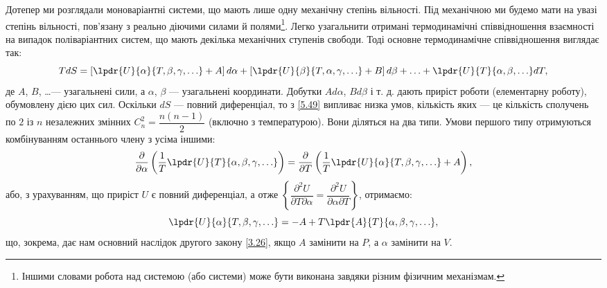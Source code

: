 Дотепер ми розглядали моноваріантні системи, що мають лише одну механічну степінь вільності. Під механічною ми будемо мати на увазі степінь вільності, пов'язану з реально діючими силами й полями\footnote{Іншими словами робота над системою (або системи) може бути виконана завдяки різним фізичним механізмам.}. Легко узагальнити отримані термодинамічні співвідношення взаємності на випадок поліваріантних систем, що мають декілька механічних ступенів свободи. Тоді основне термодинамічне співвідношення виглядає так:
\begin{equation}\label{5.49}
	TdS=\left[\lpdr{U}{\alpha}{T, \beta, \gamma, \ldots}+A\right]d\alpha
	+\left[\lpdr{U}{\beta}{T,\alpha, \gamma,
			\ldots}+B\right]d\beta+\ldots+\lpdr{U}{T}{\alpha,\beta,\ldots}dT,
\end{equation}
де $A$, $B$, \ldots --- узагальнені сили, а $\alpha$, $\beta$ --- узагальнені координати. Добутки $Ad\alpha$, $Bd\beta$ і т. д. дають приріст роботи (елементарну роботу), обумовлену дією цих сил. Оскільки $dS$ --- повний диференціал, то з \eqref{5.49} випливає низка умов, кількість яких --- це кількість сполучень по $2$ із $n$ незалежних змінних $C_{n}^{2}=\dfrac{n(n-1)}{2}$ (включно з температурою). Вони діляться на два типи. Умови першого типу отримуються комбінуванням останнього члену з усіма іншими:
\begin{equation}\label{5.50}
	\dfrac{\partial}{\partial\alpha}\left(\dfrac{1}{T}\lpdr{U}{T}{\alpha,\beta,\gamma,\ldots}\right)=\dfrac{\partial}{\partial
		T}\left(\dfrac{1}{T}\lpdr{U}{\alpha}{T,\beta, \gamma, \ldots}+A\right),
\end{equation}
або, з урахуванням, що приріст $U$ є повний диференціал, а отже $\left\{\dfrac{\partial^2 U}{\partial T\partial\alpha}=\dfrac{\partial^2 U}{\partial\alpha\partial T}\right\}$, отримаємо:
\begin{equation}\label{5.51}
	\lpdr{U}{\alpha}{T,\beta, \gamma, \ldots}=-A+T\lpdr{A}{T}{\alpha, \beta, \gamma, \ldots},
\end{equation}
що, зокрема, дає нам основний наслідок другого закону \eqref{3.26}, якщо $A$ замінити на $P$, а
$\alpha$  замінити на $V$.

